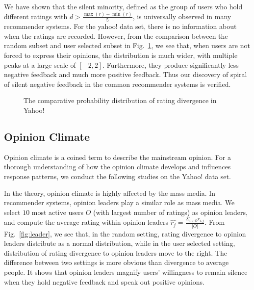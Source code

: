 \documentclass{sig-alternate}
\begin{document}
We have shown that the silent minority, defined as the group of users who hold different ratings with $d>\frac{\max(r)-\min(r)}{5}$, is universally observed in many recommender systems. For the yahoo! data set, there is no information about when the ratings are recorded. However, from the comparison between the random subset and user selected subset in Fig.~\ref{fig:yahoo}, we see that, when users are not forced to express their opinions, the distribution is much wider, with multiple peaks at a large scale of $[-2,2]$. Furthermore, they produce significantly less negative feedback and much more positive feedback. Thus our discovery of spiral of silent negative feedback in the common recommender systems is  verified.

\begin{figure}[htbp]
\centering
\centering
{}
\caption{The comparative probability distribution of rating divergence in Yahoo!}\label{fig:yahoo}
\end{figure}

\subsection{Opinion Climate}
Opinion climate is a coined term to describe the mainstream opinion. For a thorough understanding of how the opinion climate develops and influences response patterns, we conduct the following studies on the Yahoo! data set.

In the theory, opinion climate is highly affected by the mass media. In recommender systems, opinion leaders play a similar role as mass media. We select $10$ most active users $O$ (with largest number of ratings) as opinion leaders, and compute the average rating within opinion leaders $\hat{r_j}=\frac{\Sigma_{i\in O}r_{i,j}}{|O|}$. From Fig.~\ref{fig:leader}, we see that, in the random setting, rating divergence to opinion leaders distribute as a normal distribution, while in the user selected setting, distribution of rating divergence to opinion leaders move to the right. The difference between two settings is more obvious than divergence to average people. It shows that opinion leaders magnify users' willingness to remain silence when they hold negative feedback and speak out positive opinions.
\end{document}
